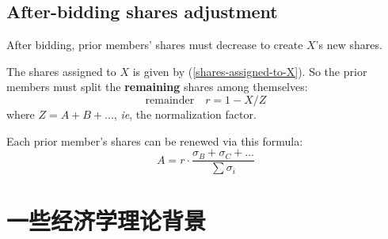 \documentclass[12pt, orivec, fleqn]{article}
\newcommand{\cc}[2]{#1}
\newcommand{\cc}[2]{#2}
\begin{document}
\secttoc
\subsection{After-bidding shares adjustment}

After bidding, prior members' shares must decrease to create $X$'s new shares.

The shares assigned to $X$ is given by (\ref{shares-assigned-to-X}).  So the prior members must split the \textbf{remaining} shares among themselves:
\begin{equation}
\boxed{\mbox{remainder}} \quad r = 1 - X / Z
\end{equation}
where $Z = A + B + ...$, \textit{ie}, the normalization factor.

Each prior member's shares can be renewed via this formula:
\begin{equation}
A = r \cdot \frac{\sigma_B + \sigma_C + ...}{\sum \sigma_i}
\end{equation}

\secttoc
\section{\cc{一些经济学理论背景}{Some economic-theoretical background}}
\end{document}
